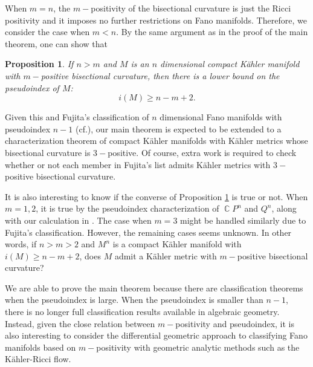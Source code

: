 \documentclass[11pt]{amsart}
\theoremstyle{plain}
\newtheorem{prop}[thm]{Proposition}
\theoremstyle{definition}
\numberwithin{equation}{section}
\DeclareMathOperator{\C}{\mathbb{C}}
\begin{document}
When $m=n$, the $m-$positivity of the bisectional curvature is just the Ricci positivity and it imposes no further restrictions on Fano manifolds. Therefore, we consider the case when $m<n$. By the same argument as in the proof of the main theorem, one can show that 
\begin{prop}\label{Prop:PseudoindexLowerBound}
    If $n>m$ and $M$ is an $n$ dimensional compact K\"{a}hler manifold with $m-$positive bisectional curvature, then there is a lower bound on the pseudoindex of $M$:
    \begin{equation}
        i(M)\ge n-m+2.
    \end{equation}
\end{prop}  

Given this and Fujita's classification of $n$ dimensional Fano manifolds with pseudoindex $n-1$ (cf.\cite{Fuj90}), our main theorem is expected to be extended to a characterization theorem of compact K\"{a}hler manifolds with K\"{a}hler metrics whose bisectional curvature is $3-$positive. Of course, extra work is required to check whether or not each member in Fujita's list admits K\"{a}hler metrics with $3-$positive bisectional curvature.

It is also interesting to know if the converse of Proposition \ref{Prop:PseudoindexLowerBound} is true or not. When $m=1,2$, it is true by the pseudoindex characterization of $\C P^n$ and $Q^n$, along with our calculation in . The case when $m=3$ might be handled similarly due to Fujita's classification. However, the remaining cases seems unknown. In other words, if $n>m>2$ and $M^n$ is a compact K\"{a}hler manifold with $i(M)\ge n-m+2$, does $M$ admit a K\"{a}hler metric with $m-$positive bisectional curvature?

We are able to prove the main theorem because there are classification theorems when the pseudoindex is large. When the pseudoindex is smaller than $n-1$, there is no longer full classification results available in algebraic geometry. Instead, given the close relation between $m-$positivity and pseudoindex, it is also interesting to consider the differential geometric approach to classifying Fano manifolds based on $m-$positivity with geometric analytic methods such as the K\"{a}hler-Ricci flow. 
\end{document}
